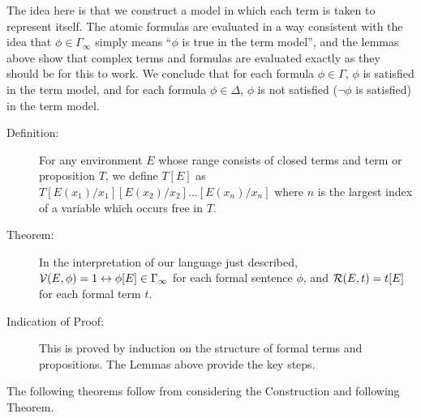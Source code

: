 \documentclass[12pt]{book}
\begin{document}
The idea here is that we construct a model in which each term is taken
to represent itself.  The atomic formulas are evaluated in a way
consistent with the idea that $\phi \in \Gamma_{\infty}$ simply means
``$\phi$ is true in the term model'', and the lemmas above show that
complex terms and formulas are evaluated exactly as they should be for
this to work.  We conclude that for each formula $\phi \in \Gamma$,
$\phi$ is satisfied in the term model, and for each formula $\phi \in
\Delta$, $\phi$ is not satisfied ($\neg \phi$ is satisfied) in the
term model.

\begin{description}

\item[Definition:] For any environment $E$ whose range consists of
closed terms and term or proposition $T$, we define $T[E]$ as
$T[E(x_1)/x_1][E(x_2)/x_2]\ldots[E(x_n)/x_n]$ where $n$ is the largest
index of a variable which occurs free in $T$.

\item[Theorem:] In the interpretation of our language just described,
${\cal V}(E,\phi) = 1 \leftrightarrow \phi[E] \in \Gamma_{\infty}$ for each formal
sentence $\phi$, and ${\cal R}(E,t) = t[E]$ for each formal term $t$.

\item[Indication of Proof:] This is proved by induction on the
structure of formal terms and propositions.  The Lemmas above provide
the key steps.

\end{description}

\newpage

The following theorems follow from considering the Construction and
following Theorem.
\end{document}
